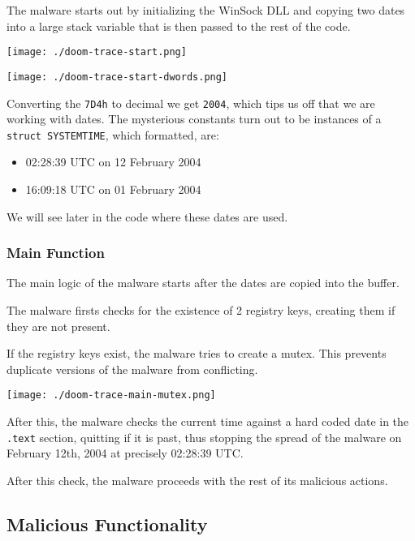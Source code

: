 \documentclass[11pt]{article}
\begin{document}
The malware starts out by initializing the WinSock DLL and copying two
dates into a large stack variable that is then passed to the rest of
the code.

\begin{center}
\texttt{[image: ./doom-trace-start.png]}
\end{center}

\begin{center}
\texttt{[image: ./doom-trace-start-dwords.png]}
\end{center}

Converting the \texttt{7D4h} to decimal we get \texttt{2004}, which tips us off that
we are working with dates. The mysterious constants turn out to be
instances of a \texttt{struct SYSTEMTIME}, which formatted, are:

\begin{itemize}
\item 02:28:39 UTC on 12 February 2004
\item 16:09:18 UTC on 01 February 2004
\end{itemize}

We will see later in the code where these dates are used.
\subsubsection{Main Function}
\label{sec:org2a9cfba}
The main logic of the malware starts after the dates are copied into
the buffer.

The malware firsts checks for the existence of 2 registry keys,
creating them if they are not present.

If the registry keys exist, the malware tries to create a mutex. This
prevents duplicate versions of the malware from conflicting.

\begin{center}
\texttt{[image: ./doom-trace-main-mutex.png]}
\end{center}

After this, the malware checks the current time against a hard coded
date in the \texttt{.text} section, quitting if it is past, thus stopping the
spread of the malware on February 12th, 2004 at precisely 02:28:39
UTC.

After this check, the malware proceeds with the rest of its malicious
actions.
\subsection{Malicious Functionality}
\label{sec:orgfa88499}
\end{document}
